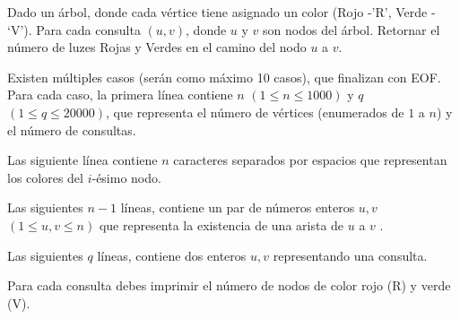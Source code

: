 
Dado un árbol, donde cada vértice tiene asignado un color (Rojo -'R', Verde - ‘V’). Para cada consulta $(u,v)$, donde $u$ y $v$ son nodos del árbol. Retornar el número de luzes Rojas y Verdes en el camino del nodo $u$ a $v$.



Existen múltiples casos (serán como máximo 10 casos), que finalizan con EOF.
Para cada caso, la primera línea contiene $n$ $(1 \leq n \leq 1000)$  y $q$ $(1 \leq q \leq 20000)$, que representa el número de vértices (enumerados de $1$ a $ n$) y el número de consultas.

Las siguiente línea contiene $n$ caracteres separados por espacios que representan los colores del $i$-ésimo nodo.

Las siguientes $n - 1$ líneas, contiene un par de números enteros $u, v$ $(1 \leq u,v \leq n)$ que representa la existencia de una arista de $u$ a $v$ .

Las siguientes $q$ líneas, contiene dos enteros $u,v $ representando una consulta.

\outputText

Para cada consulta debes imprimir el número de nodos de color rojo (R) y verde (V).

\exampleCases

\begin{example}
\end{example}
